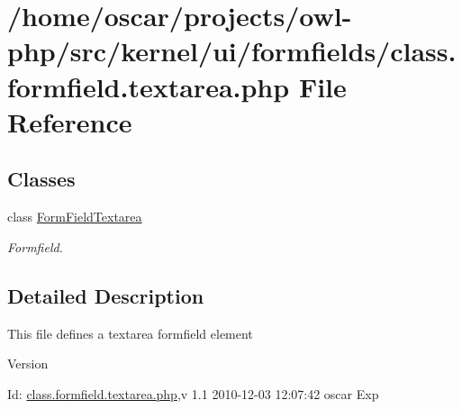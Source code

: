 \section{/home/oscar/projects/owl-\/php/src/kernel/ui/formfields/class.formfield.textarea.php File Reference}
\label{class_8formfield_8textarea_8php}
\subsection*{Classes}
\begin{DoxyCompactItemize}
\item 
class \hyperlink{classFormFieldTextarea}{FormFieldTextarea}
\begin{DoxyCompactList}\small\item\em Formfield. \item\end{DoxyCompactList}\end{DoxyCompactItemize}


\subsection{Detailed Description}
This file defines a textarea formfield element \begin{DoxyVersion}{Version}

\end{DoxyVersion}
\begin{DoxyParagraph}{Id:}
\hyperlink{class_8formfield_8textarea_8php}{class.formfield.textarea.php},v 1.1 2010-\/12-\/03 12:07:42 oscar Exp 
\end{DoxyParagraph}
